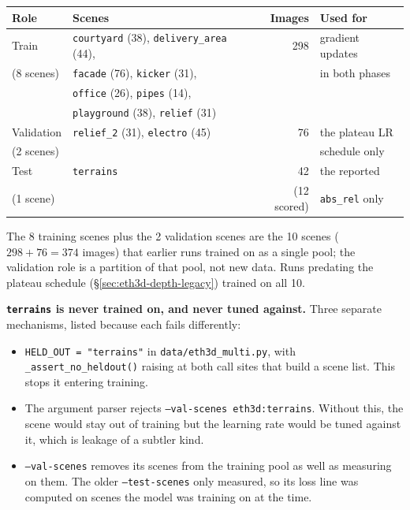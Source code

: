 \documentclass[11pt,a4paper]{article}
\begin{document}
\begin{center}\small
\begin{tabular}{llrl}
\toprule
\textbf{Role} & \textbf{Scenes} & \textbf{Images} & \textbf{Used for} \\
\midrule
Train      & \texttt{courtyard} (38), \texttt{delivery\_area} (44), & 298 & gradient updates \\
(8 scenes) & \texttt{facade} (76), \texttt{kicker} (31),            &     & in both phases \\
           & \texttt{office} (26), \texttt{pipes} (14),             &     & \\
           & \texttt{playground} (38), \texttt{relief} (31)         &     & \\
\midrule
Validation & \texttt{relief\_2} (31), \texttt{electro} (45)          & 76  & the plateau LR \\
(2 scenes) &                                                        &     & schedule only \\
\midrule
Test       & \texttt{terrains}                                      & 42  & the reported \\
(1 scene)  &                                                        & (12 scored) & \texttt{abs\_rel} only \\
\bottomrule
\end{tabular}
\end{center}

\noindent The 8 training scenes plus the 2 validation scenes are the 10 scenes
($298+76=374$ images) that earlier runs trained on as a single pool; the
validation role is a partition of that pool, not new data. Runs predating the
plateau schedule (\S\ref{sec:eth3d-depth-legacy}) trained on all 10.

\noindent\textbf{\texttt{terrains} is never trained on, and never tuned against.}
Three separate mechanisms, listed because each fails differently:

\begin{itemize}
\item \texttt{HELD\_OUT = "terrains"} in \texttt{data/eth3d\_multi.py}, with
      \texttt{\_assert\_no\_heldout()} raising at both call sites that build a
      scene list. This stops it entering training.
\item The argument parser rejects \texttt{--val-scenes eth3d:terrains}. Without
      this, the scene would stay out of training but the learning rate would be
      tuned against it, which is leakage of a subtler kind.
\item \texttt{--val-scenes} removes its scenes from the training pool as well as
      measuring on them. The older \texttt{--test-scenes} only measured, so its
      loss line was computed on scenes the model was training on at the time.
\end{itemize}
\end{document}
